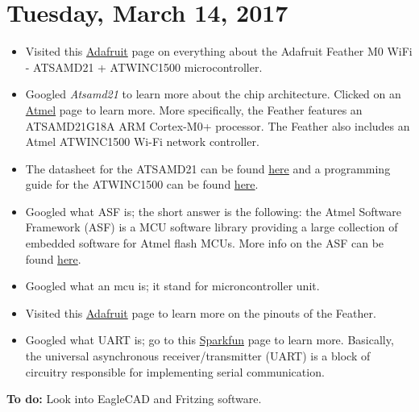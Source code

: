 \documentclass[12pt]{article}
\begin{document}
\section{Tuesday, March 14, 2017}
\begin{itemize}
\item Visited this \href{https://www.adafruit.com/product/3010}{Adafruit} page on everything about the Adafruit Feather M0 WiFi - ATSAMD21 + ATWINC1500 microcontroller.
\item Googled \textsl{Atsamd21} to learn more about the chip architecture. Clicked on an \href{http://www.atmel.com/products/microcontrollers/arm/sam-d.aspx}{Atmel} page to learn more. More specifically, the Feather features an ATSAMD21G18A ARM Cortex-M0+ processor. The Feather also includes an Atmel ATWINC1500 Wi-Fi network controller.
\item The datasheet for the ATSAMD21 can be found \href{https://cdn-learn.adafruit.com/assets/assets/000/030/130/original/atmel-42181-sam-d21_datasheet.pdf?1453847579}{here} and a programming guide for the ATWINC1500 can be found \href{https://cdn-learn.adafruit.com/assets/assets/000/030/129/original/atmel-42418-software-programming-guide-for-atwinc1500-wifi-using-samd21-xplained-pro_userguide.pdf?1453847486}{here}.
\item Googled what ASF is; the short answer is the following: the Atmel Software Framework (ASF) is a MCU software library providing a large collection of embedded software for Atmel flash MCUs. More info on the ASF can be found \href{http://www.atmel.com/tools/avrsoftwareframework.aspx}{here}.
\item Googled what an mcu is; it stand for microncontroller unit.
\item Visited this \href{https://learn.adafruit.com/adafruit-feather-m0-wifi-atwinc1500/pinouts}{Adafruit} page to learn more on the pinouts of the Feather.
\item Googled what UART is; go to this \href{https://learn.sparkfun.com/tutorials/serial-communication/uarts}{Sparkfun} page to learn more. Basically, the universal asynchronous receiver/transmitter (UART) is a block of circuitry responsible for implementing serial communication.
\end{itemize}

\textbf{To do:} Look into EagleCAD and Fritzing software.
\end{document}
